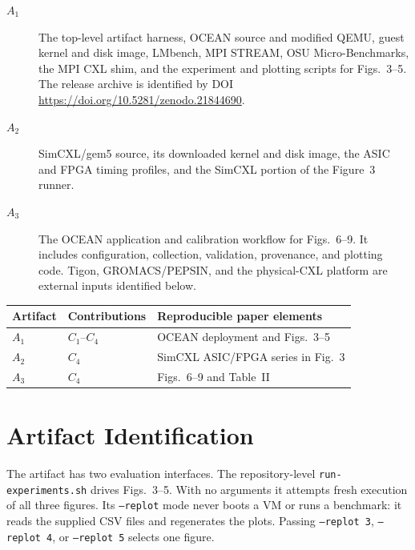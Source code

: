 \documentclass[conference]{IEEEtran}
\begin{document}
\begin{description}
\item[$A_1$] The top-level artifact harness, OCEAN source and modified QEMU,
guest kernel and disk image, LMbench, MPI STREAM, OSU Micro-Benchmarks, the
MPI CXL shim, and the experiment and plotting scripts for Figs.~3--5.  The
release archive is identified by DOI
\url{https://doi.org/10.5281/zenodo.21844690}.

\item[$A_2$] SimCXL/gem5 source, its downloaded kernel and disk image, the
ASIC and FPGA timing profiles, and the SimCXL portion of the Figure~3 runner.

\item[$A_3$] The OCEAN application and calibration workflow for
Figs.~6--9.  It includes configuration, collection, validation, provenance,
and plotting code.  Tigon, GROMACS/PEPSIN, and the physical-CXL platform are
external inputs identified below.
\end{description}

\begin{center}
\small
\begin{tabular}{p{}p{}p{}}
\toprule
Artifact & Contributions & Reproducible paper elements \\
\midrule
$A_1$ & $C_1$--$C_4$ & OCEAN deployment and Figs.~3--5 \\
$A_2$ & $C_4$ & SimCXL ASIC/FPGA series in Fig.~3 \\
$A_3$ & $C_4$ & Figs.~6--9 and Table~II \\
\bottomrule
\end{tabular}
\end{center}

\section{Artifact Identification}

\newartifact

\artrel

The artifact has two evaluation interfaces.  The repository-level
\texttt{run-experiments.sh} drives Figs.~3--5.  With no arguments it attempts
fresh execution of all three figures.  Its \texttt{--replot} mode never boots
a VM or runs a benchmark: it reads the supplied CSV files and regenerates the
plots.  Passing \texttt{--replot 3}, \texttt{--replot 4}, or
\texttt{--replot 5} selects one figure.
\end{document}
